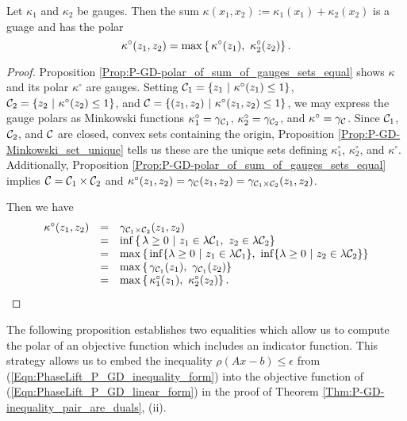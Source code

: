\begin{prop}			\label{Prop:P-GD-polar_of_sum_of_gauges}
Let $\kappa_1$ and $\kappa_2$ be gauges.  Then the sum $\kappa(x_1, x_2) := \kappa_1(x_1) + \kappa_2(x_2)$ is a guage and has the polar
\begin{equation}			\label{Eqn:polar_of_sum_of_gauges}
\kappa^\circ(z_1, z_2) = \max \left\{ \halfspace \kappa^\circ(z_1), \ \kappa_2^\circ(z_2) \right\}.
\end{equation}
\end{prop}
\begin{proof}
Proposition \ref{Prop:P-GD-polar_of_sum_of_gauges_sets_equal} shows $\kappa$ and its polar $\kappa^\circ$ are gauges.  Setting $\caC_1 = \{ z_1 \ | \ \kappa^\circ(z_1) \leq 1 \}$, ${\mathcal C}_2 = \{ z_2 \ | \ \kappa^\circ(z_2) \leq 1 \}$, and ${\mathcal C} = \{ (z_1, z_2) \ | \ \kappa^\circ(z_1, z_2) \leq 1 \}$, we may express the gauge polars as Minkowski functions $\kappa_1^\circ = \gamma_{{\mathcal C}_1}$, $\kappa_2^\circ = \gamma_{{\mathcal C}_2}$, and $\kappa^\circ = \gamma_{{\mathcal C}}$.  
Since ${\mathcal C}_1$, ${\mathcal C}_2$, and ${\mathcal C}$ are closed, convex sets containing the origin, Proposition \ref{Prop:P-GD-Minkowski_set_unique} tells us these are the unique sets defining $\kappa_1^\circ$, $\kappa_2^\circ$, and $\kappa^\circ$.  Additionally, Proposition \ref{Prop:P-GD-polar_of_sum_of_gauges_sets_equal} implies ${\mathcal C} = {\mathcal C}_1 \times {\mathcal C}_2$ and $\kappa^\circ(z_1, z_2) =	\gamma_{{\mathcal C}}(z_1, z_2) 	=	\gamma_{{\mathcal C}_1 \times {\mathcal C}_2}(z_1, z_2)$.


Then we have
\begin{equation}
\begin{array}{rll}
\kappa^\circ(z_1, z_2)	  & =	&	\gamma_{\caC_1 \times \caC_2}(z_1, z_2)	\\
	&	=	&	\inf \left\{ \halfspace \lambda \geq 0 \ | \ z_1 \in \lambda \caC_1, \ z_2 \in \lambda \caC_2 \right\} \\
	&	=	&	\max \left\{ \halfspace \inf \{ \lambda \geq 0 \ | \ z_1 \in \lambda \caC_1 \}, 
									\ \inf \{ \lambda \geq 0 \ | \ z_2 \in \lambda \caC_2 \} 	\right\}	\\
	&	=	&	\max \left\{ \halfspace \gamma_{\caC_1}(z_1), \ \gamma_{\caC_1}(z_2) \right\}	\\
	&	=	&	\max \left\{ \halfspace \kappa_1^\circ(z_1), \ \kappa_2^\circ(z_2) \right\}.
\end{array}
\end{equation}
\end{proof}


The following proposition establishes two equalities which allow us to compute the polar of an objective function which includes an indicator function.  This strategy allows us to embed the inequality $\rho(Ax-b) \leq \epsilon$ from (\ref{Eqn:PhaseLift_P_GD_inequality_form}) into the objective function of (\ref{Eqn:PhaseLift_P_GD_linear_form}) in the proof of Theorem \ref{Thm:P-GD-inequality_pair_are_duals}, (ii).


